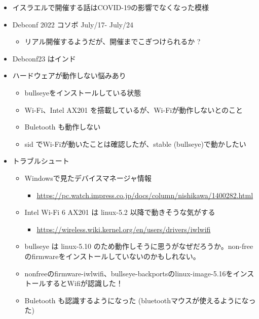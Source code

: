 \documentclass[mingoth,a4paper]{jsarticle}
\begin{document}

\begin{itemize}
\item イスラエルで開催する話はCOVID-19の影響でなくなった模様
\item Debconf 2022 コソボ July/17- July/24
  \begin{itemize}
  \item リアル開催するようだが、開催までこぎつけられるか ?
  \end{itemize}
\item Debconf23 はインド
\end{itemize}



\begin{itemize}
\item ハードウェアが動作しない悩みあり
  \begin{itemize}
  \item bullseyeをインストールしている状態
  \item Wi-Fi、Intel AX201 を搭載しているが、Wi-Fiが動作しないとのこと
  \item Buletooth も動作しない
  \item sid でWi-Fiが動いたことは確認したが、stable (bullseye)で動かしたい
  \end{itemize}
\item トラブルシュート
  \begin{itemize}
  \item Windowsで見たデバイスマネージャ情報
    \begin{itemize}
    \item \url{https://pc.watch.impress.co.jp/docs/column/nishikawa/1400282.html}
    \end{itemize}
  \item Intel Wi-Fi 6 AX201 は linux-5.2 以降で動きそうな気がする
    \begin{itemize}
    \item \url{https://wireless.wiki.kernel.org/en/users/drivers/iwlwifi}
    \end{itemize}
  \item bullseye は linux-5.10 のため動作しそうに思うがなぜだろうか。non-free のfirmwareをインストールしていないのかもしれない。
  \item nonfreeのfirmware-iwlwifi、bullseye-backportsのlinux-image-5.16をインストールするとWifiが認識した！
  \item Buletooth も認識するようになった (bluetoothマウスが使えるようになった)
  \end{itemize}
\end{itemize}
\end{document}
